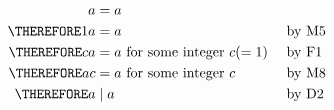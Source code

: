 \begin{align*}
           a &= a                                      & & \\
\THEREFORE 1a &= a                                     & & \text{by M5} \\
\THEREFORE ca &= a \text{ for some integer $c (= 1)$ } & & \text{by F1} \\
\THEREFORE ac &= a \text{ for some integer $c$ }       & & \text{by M8} \\
\THEREFORE a &\mid a                                   & & \text{by D2} \\
\end{align*}
